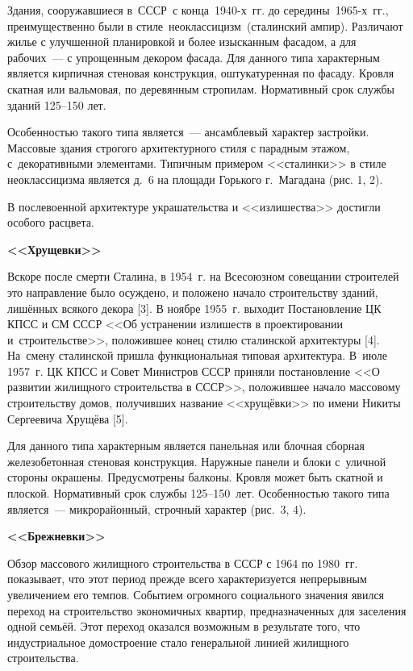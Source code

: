 Здания, сооружавшиеся в СССР с конца 1940-х~гг. до середины 1965-х~гг., преимущественно были в стиле неоклассицизм (сталинский ампир). Различают жилье с улучшенной планировкой и более изысканным фасадом, а для рабочих~--- с упрощенным декором фасада. Для данного типа характерным является кирпичная стеновая конструкция, оштукатуренная по фасаду. Кровля скатная или вальмовая, по деревянным стропилам. Нормативный срок службы зданий 125--150 лет.

Особенностью такого типа является~--- ансамблевый характер застройки. Массовые здания строгого архитектурного стиля с парадным этажом, с~декоративными элементами. Типичным примером <<сталинки>> в стиле неоклассицизма является д.~6 на площади Горького г.~Магадана (рис. 1, 2).

В послевоенной архитектуре украшательства и <<излишества>> достигли особого расцвета.



\textbf{<<Хрущевки>>}

Вскоре после смерти Сталина, в 1954~г. на Всесоюзном совещании строителей это направление было осуждено, и положено начало строительству зданий, лишённых всякого декора [3].  В ноябре 1955~г. выходит Постановление ЦК КПСС и СМ СССР <<Об устранении излишеств в проектировании и~строительстве>>, положившее конец стилю сталинской архитектуры [4]. На~смену сталинской пришла функциональная типовая архитектура. В~июле 1957~г. ЦК КПСС и Совет Министров СССР приняли постановление <<О развитии жилищного строительства в СССР>>, положившее начало массовому строительству домов, получивших название <<хрущёвки>> по имени Никиты Сергеевича Хрущёва [5].

Для данного типа характерным является панельная или блочная сборная железобетонная стеновая конструкция. Наружные панели и блоки с~уличной стороны окрашены. Предусмотрены балконы.  Кровля может быть скатной и плоской. Нормативный срок службы 125--150~лет. Особенностью такого типа является~--- микрорайонный, строчный характер (рис.~3, 4).



\textbf{<<Брежневки>>}

Обзор массового жилищного строительства в СССР с 1964 по 1980~гг. показывает, что этот период прежде всего характеризуется непрерывным увеличением его темпов. Событием огромного социального значения явился переход на строительство экономичных квартир, предназначенных для заселения одной семьёй. Этот переход оказался возможным в результате того, что индустриальное домостроение стало генеральной линией жилищного строительства.


